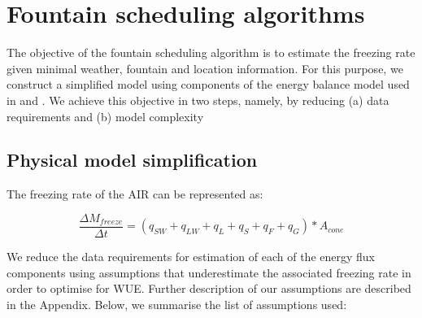 \documentclass[utf8]{frontiersSCNS}
\begin{document}
\section{Fountain scheduling algorithms}

The objective of the fountain scheduling algorithm is to estimate the freezing rate given minimal weather,
fountain and location information. For this purpose, we construct a simplified model using components of the
energy balance model used in \cite{balasubramanianInfluenceMeteorologicalConditions2022} and
\cite{oerlemansBriefCommunicationGrowth2021}. We achieve this objective in two steps, namely, by reducing
(a) data requirements and (b) model complexity 

\subsection{Physical model simplification}
The freezing rate of the AIR can be represented as: 

\begin{equation}
	 \frac{\Delta M_{freeze}}{\Delta t}  = (q_{SW} + q_{LW} + q_{L} + q_{S} + q_{F} + q_{G}) * A_{cone}
	\label{eqn:freeze}
\end{equation}

We reduce the data requirements for estimation of each of the energy flux components using assumptions that
underestimate the associated freezing rate in order to optimise for WUE. Further description of our assumptions
are described in the Appendix. Below, we summarise the list of assumptions used:
\end{document}
